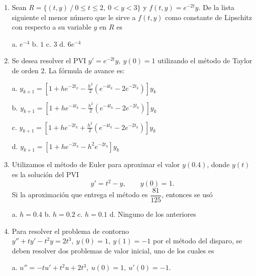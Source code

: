 \documentclass[11pt]{article}
\begin{document}
\begin{enumerate}
\item{} Sean $R=\{(t,y)\ /\ 0\leq t\leq 2,\ 0<y<3\}$ y $f(t,y)=e^{-2t}y$. De la lista siguiente el menor número que le sirve a $f(t,y)$ como constante de Lipschitz con respecto a su variable $y$ en $R$ es

\vspace{4pt}
\noindent a. $e^{-4}$ \hspace{1cm} b. $1$ \hspace{1cm} c. $3$ \hspace{1cm} d. $6e^{-4}$

\item{} Se desea resolver el PVI $y'=e^{-2t}y,\ y(0)=1$ utilizando el método de Taylor de orden 2. La fórmula de avance es:

\vspace{4pt}
\noindent a. $y_{k+1} = \left[1+he^{-2t_k}-\frac{h^2}{2}\left(e^{-4t_k}-2e^{-2t_k}\right)\right]y_k$

\vspace{4pt}
\noindent b. $y_{k+1} = \left[1+he^{-4t_k}-\frac{h^2}{2}\left(e^{-4t_k}-2e^{-2t_k}\right)\right]y_k$

\vspace{4pt}
\noindent c. $y_{k+1} = \left[1+he^{-2t_k}+\frac{h^2}{2}\left(e^{-4t_k}-2e^{-2t_k}\right)\right]y_k$

\vspace{4pt}
\noindent d. $y_{k+1} = \left[1+he^{-2t_k}-h^2e^{-2t_k}\right]y_k$

\item{} Utilizamos el método de Euler para aproximar el valor $y(0.4)$, donde $y(t)$ es la solución del PVI
\[
y' = t^2-y,\qquad y(0)=1. \tag{1}
\]
Si la aproximación que entrega el método es $\dfrac{81}{125}$, entonces se usó

\vspace{4pt}
\noindent a. $h=0.4$ \hspace{1cm} b. $h=0.2$ \hspace{1cm} c. $h=0.1$ \hspace{1cm} d. Ninguno de los anteriores

\item{} Para resolver el problema de contorno $y''+ty'-t^2y=2t^3,\ y(0)=1,\ y(1)=-1$ por el método del disparo, se deben resolver dos problemas de valor inicial, uno de los cuales es

\vspace{4pt}
\noindent a. $u''=-tu'+t^2u+2t^3,\ u(0)=1,\ u'(0)=-1$.


\end{enumerate}
\end{document}
